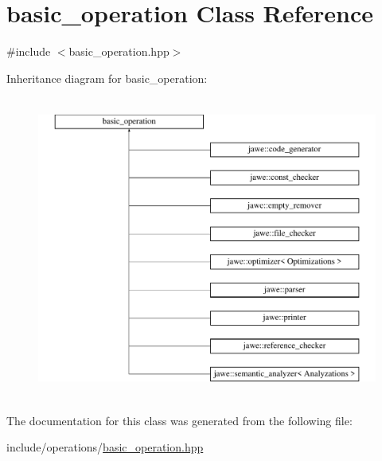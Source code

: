 \hypertarget{classbasic__operation}{}\section{basic\+\_\+operation Class Reference}
\label{classbasic__operation}


{\ttfamily \#include $<$basic\+\_\+operation.\+hpp$>$}

Inheritance diagram for basic\+\_\+operation\+:\begin{figure}[H]
\begin{center}
\leavevmode
\includegraphics[height=10.000000cm]{classbasic__operation}
\end{center}
\end{figure}


The documentation for this class was generated from the following file\+:\begin{DoxyCompactItemize}
\item 
include/operations/\hyperlink{basic__operation_8hpp}{basic\+\_\+operation.\+hpp}\end{DoxyCompactItemize}

